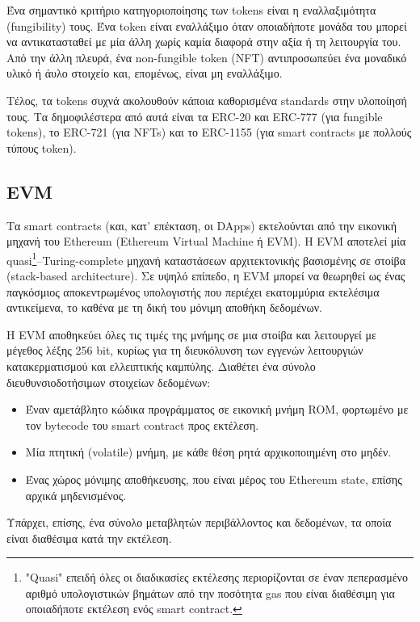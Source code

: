 Ένα σημαντικό κριτήριο κατηγοριοποίησης των tokens είναι η εναλλαξιμότητα (fungibility) τους. Ένα token είναι εναλλάξιμο όταν οποιαδήποτε μονάδα του μπορεί να αντικατασταθεί με μία άλλη χωρίς καμία διαφορά στην αξία ή τη λειτουργία του. Από την άλλη πλευρά, ένα non-fungible token (NFT) αντιπροσωπεύει ένα μοναδικό υλικό ή άυλο στοιχείο και, επομένως, είναι μη εναλλάξιμο.

Τέλος, τα tokens συχνά ακολουθούν κάποια καθορισμένα standards στην υλοποίησή τους. Τα δημοφιλέστερα από αυτά είναι τα ERC-20 και ERC-777 (για fungible tokens), το ERC-721 (για NFTs) και το ERC-1155 (για smart contracts με πολλούς τύπους token).

\subsection{EVM} \label{subsection:2-6-5-evm}
Τα smart contracts (και, κατ' επέκταση, οι DApps) εκτελούνται από την εικονική μηχανή του Ethereum (Ethereum Virtual Machine ή EVM). Η EVM αποτελεί μία quasi\footnote{"Quasi" επειδή όλες οι διαδικασίες εκτέλεσης περιορίζονται σε έναν πεπερασμένο αριθμό υπολογιστικών βημάτων από την ποσότητα gas που είναι διαθέσιμη για οποιαδήποτε εκτέλεση ενός smart contract.}–Turing-complete μηχανή καταστάσεων αρχιτεκτονικής βασισμένης σε στοίβα (stack-based architecture). Σε υψηλό επίπεδο, η EVM μπορεί να θεωρηθεί ως ένας παγκόσμιος αποκεντρωμένος υπολογιστής που περιέχει εκατομμύρια εκτελέσιμα αντικείμενα, το καθένα με τη δική του μόνιμη αποθήκη δεδομένων.

Η EVM αποθηκεύει όλες τις τιμές της μνήμης σε μια στοίβα και λειτουργεί με μέγεθος λέξης 256 bit, κυρίως για τη διευκόλυνση των εγγενών λειτουργιών κατακερματισμού και ελλειπτικής καμπύλης. Διαθέτει ένα σύνολο διευθυνσιοδοτήσιμων στοιχείων δεδομένων:

\begin{itemize}
	\item Έναν αμετάβλητο κώδικα προγράμματος σε εικονική μνήμη ROM, φορτωμένο με τον \textenglish{bytecode} του smart contract προς εκτέλεση.
	\item Μία πτητική (volatile) μνήμη, με κάθε θέση ρητά αρχικοποιημένη στο μηδέν.
	\item Ένας χώρος μόνιμης αποθήκευσης, που είναι μέρος του Ethereum state, επίσης αρχικά μηδενισμένος.
\end{itemize}

Υπάρχει, επίσης, ένα σύνολο μεταβλητών περιβάλλοντος και δεδομένων, τα οποία είναι διαθέσιμα κατά την εκτέλεση.\cite{2.6-ethereum-mastering}
